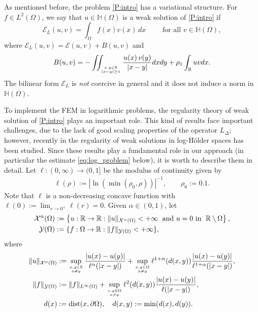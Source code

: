 \documentclass[11 pt]{article}
\numberwithin{equation}{section}
\def\dist{\operatorname{dist}}
\def\R{\mathbb{R}}
\def\mH{\mathbb{H}}
\def\cE{\mathcal{E}}
\begin{document}
As mentioned before, the problem \eqref{P:intro} has a variational structure. For $f\in L^2(\Omega)$, we say that $u\in \mH(\Omega)$ is a weak solution of \eqref{P:intro} if
\begin{equation*}
    \cE_{L}(u,v)=\int_{\Omega} f(x) v(x)\, dx \qquad \text{ for all } v\in  \mH(\Omega),
\end{equation*}
where $\cE_L(u,v)=\cE(u,v)+B(u,v)$ and
\begin{align}\label{eq:bilinear_B}
    B(u,v)=-\iint_{x,y\in\R\atop |x-y|\geq 1}\frac{u(x)\,v(y)}{|x-y|}dx dy+\rho_1\int_{\R}u v dx.
\end{align}
 The bilinear form $\cE_L$ is \emph{not} coercive in general and it does not induce a norm in $\mH(\Omega)$.

To implement the FEM in logarithmic problems, the regularity theory of weak solution of \eqref{P:intro} plays an important role. This kind of results face important challenges, due to the lack of good scaling properties of the operator $L_\Delta$; however, recently in \cite{CS22} the regularity of weak solutions in log-Hölder spaces has been studied.  Since these results play a fundamental role in our approach (in particular the estimate \eqref{eq:log_problem} below), it is worth to describe them in detail. Let $\ell:(0,\infty)\to (0,1]$ be the modulus of continuity given by
\begin{align}\label{ell:def}
\ell(\rho) := |\ln(\min(\rho_0,\rho))|^{-1}, \qquad\rho_0:=0.1.
\end{align}
Note that $\ell$ is a non-decreasing concave function with $\ell(0) := \lim_{r\to0^+}\ell(r)=0$. Given $\alpha\in(0,1)$, let
%
\begin{align*}
    \mathcal X^\alpha(\Omega)&:=\left\{u:\mathbb R\to \mathbb R:\|u\|_{X^\alpha(\Omega)}<+\infty \;\textnormal{ and $u=0$ in }\; \R\setminus \Omega\right\}, \\
    \mathcal Y(\Omega)&:=\{f:\Omega\to \mathbb R:\|f\|_{\mathcal Y(\Omega)}<+\infty\},
\end{align*}
%
where
%
\begin{align*}
    \|u\|_{\mathcal X^\alpha(\Omega)}&:=\sup_{x,y\in\mathbb R \atop x\neq y}\frac{|u(x)-u(y)|}{\ell^{\alpha}(|x-y|)}+\sup_{x,y\in\Omega \atop x\neq y}\ell^{1+\alpha}(d(x,y))\frac{|u(x)-u(y)|}{\ell^{1+\alpha}(|x-y|)}, \\
    \|f\|_{\mathcal Y(\Omega)}&:=\|f\|_{L^\infty(\Omega)}+\sup_{x,y\in\Omega \atop x\neq y}\ell^{2}(d(x,y))\frac{|u(x)-u(y)|}{\ell(|x-y  |)}, \\
    d(x)&:=\dist(x,\partial \Omega), \quad d(x,y):=\min(d(x),d(y)).
\end{align*}
\end{document}
